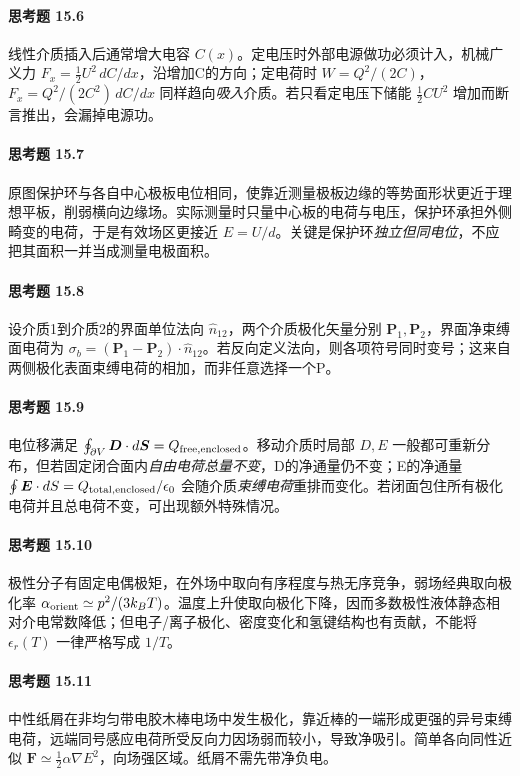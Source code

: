 \paragraph{思考题 15.6}
线性介质插入后通常增大电容 \(C(x)\)。定电压时外部电源做功必须计入，机械广义力 \(\boxed{F_x=\tfrac12U^2\,dC/dx}\)，沿增加C的方向；定电荷时 \(W=Q^2/(2C)\)，\(\boxed{F_x=Q^2/(2C^2)\,dC/dx}\) 同样趋向\emph{吸入}介质。若只看定电压下储能 \(\tfrac12 CU^2\) 增加而断言推出，会漏掉电源功。

\paragraph{思考题 15.7}
原图保护环与各自中心极板电位相同，使靠近测量极板边缘的等势面形状更近于理想平板，削弱横向边缘场。实际测量时只量中心板的电荷与电压，保护环承担外侧畸变的电荷，于是有效场区更接近 \(E=U/d\)。关键是保护环\emph{独立但同电位}，不应把其面积一并当成测量电极面积。

\paragraph{思考题 15.8}
设介质1到介质2的界面单位法向 \(\hat n_{12}\)，两个介质极化矢量分别 \(\boldsymbol P_1,\boldsymbol P_2\)，界面净束缚面电荷为 \(\boxed{\sigma_b=(\boldsymbol P_1-\boldsymbol P_2)\cdot\hat n_{12}}\)。若反向定义法向，则各项符号同时变号；这来自两侧极化表面束缚电荷的相加，而非任意选择一个P。

\paragraph{思考题 15.9}
电位移满足 \(\oint_{\partial V}\boldsymbol D\cdot d\boldsymbol S=Q_{\rm free,enclosed}\)。移动介质时局部 \(D,E\) 一般都可重新分布，但若固定闭合面内\emph{自由电荷总量不变}，D的净通量仍不变；E的净通量 \(\oint\boldsymbol E\cdot dS=Q_{\rm total,enclosed}/\epsilon_0\) 会随介质\emph{束缚电荷}重排而变化。若闭面包住所有极化电荷并且总电荷不变，可出现额外特殊情况。

\paragraph{思考题 15.10}
极性分子有固定电偶极矩，在外场中取向有序程度与热无序竞争，弱场经典取向极化率 \(\alpha_{\rm orient}\simeq p^2/(3k_BT)\)。温度上升使取向极化下降，因而多数极性液体静态相对介电常数降低；但电子/离子极化、密度变化和氢键结构也有贡献，不能将 \(\epsilon_r(T)\) 一律严格写成 \(1/T\)。

\paragraph{思考题 15.11}
中性纸屑在非均匀带电胶木棒电场中发生极化，靠近棒的一端形成更强的异号束缚电荷，远端同号感应电荷所受反向力因场弱而较小，导致净吸引。简单各向同性近似 \(\boxed{\boldsymbol F\simeq\tfrac12\alpha\nabla E^2}\)，向场强区域。纸屑不需先带净负电。

